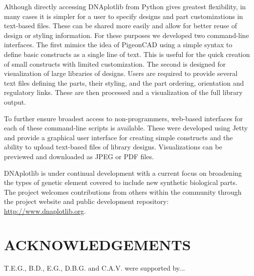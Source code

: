 \documentclass{bioinfo}
\begin{document}
Although directly accessing DNAplotlib from Python gives greatest flexibility, in many cases it is simpler for a user to specify designs and part customizations in text-based files. These can be shared more easily and allow for better reuse of design or styling information. For these purposes we developed two command-line interfaces. The first mimics the idea of PigeonCAD using a simple syntax to define basic constructs as a single line of text. This is useful for the quick creation of small constructs with limited customization. The second is designed for visualization of large libraries of designs. Users are required to provide several text files defining the parts, their styling, and the part ordering, orientation and regulatory links. These are then processed and a visualization of the full library output.

To further ensure broadest access to non-programmers, web-based interfaces for each of these command-line scripts is available. These were developed using Jetty and provide a graphical user interface for creating simple constructs and the ability to upload text-based files of library designs. Visualizations can be previewed and downloaded as JPEG or PDF files.

DNAplotlib is under continual development with a current focus on broadening the types of genetic element covered to include new synthetic biological parts. The project welcomes contributions from others within the community through the project website and public development repository: \href{http://www.dnaplotlib.org}{http://www.dnaplotlib.org}.

\section*{ACKNOWLEDGEMENTS}
T.E.G., B.D., E.G., D.B.G. and C.A.V. were supported by...
\end{document}
